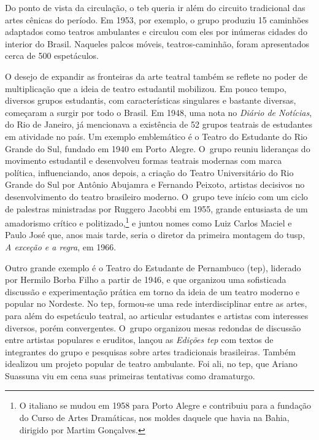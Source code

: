 Do ponto de vista da circulação, o {\sc teb} queria ir além do circuito
tradicional das artes cênicas do período. Em 1953, por exemplo, o grupo
produziu 15 caminhões adaptados como teatros ambulantes e circulou com
eles por inúmeras cidades do interior do Brasil. Naqueles palcos móveis,
teatros-caminhão, foram apresentados cerca de 500 espetáculos.

\subject{Constituição de uma cena estudantil no teatro brasileiro dos anos
1940 e 1950}

O desejo de expandir as fronteiras da arte teatral também se reflete no
poder de multiplicação que a ideia de teatro estudantil mobilizou. Em
pouco tempo, diversos grupos estudantis, com características singulares
e bastante diversas, começaram a surgir por todo o Brasil. Em 1948, uma
nota no {\it Diário de Notícias}, do Rio de Janeiro, já mencionava a
existência de 52 grupos teatrais de estudantes em atividade no país. Um
exemplo emblemático é o Teatro do Estudante do Rio Grande do Sul,
fundado em 1940 em Porto Alegre. O~grupo reuniu lideranças do movimento
estudantil e desenvolveu formas teatrais modernas com marca política,
influenciando, anos depois, a criação do Teatro Universitário do Rio
Grande do Sul por Antônio Abujamra e Fernando Peixoto, artistas
decisivos no desenvolvimento do teatro brasileiro moderno. O~grupo teve
início com um ciclo de palestras ministradas por Ruggero Jacobbi em
1955, grande entusiasta de um amadorismo crítico e
politizado,\footnote{O italiano se mudou em 1958 para Porto Alegre e
  contribuiu para a fundação do Curso de Artes Dramáticas, nos moldes
  daquele que havia na Bahia, dirigido por Martim Gonçalves.} e juntou
nomes como Luiz Carlos Maciel e Paulo José que, anos mais tarde, seria o
diretor da primeira montagem do {\sc tusp}, {\it A exceção e a regra}, em 1966.

Outro grande exemplo é o Teatro do Estudante de Pernambuco ({\sc tep}),
liderado por Hermilo Borba Filho a partir de 1946, e que organizou uma
sofisticada discussão e experimentação prática em torno da ideia de um
teatro moderno e popular no Nordeste. No {\sc tep}, formou-se uma rede
interdisciplinar entre as artes, para além do espetáculo teatral, ao
articular estudantes e artistas com interesses diversos, porém
convergentes. O~grupo organizou mesas redondas de discussão entre
artistas populares e eruditos, lançou as {\it Edições {\sc tep}} com textos de
integrantes do grupo e pesquisas sobre artes tradicionais brasileiras.
Também idealizou um projeto popular de teatro ambulante. Foi ali, no {\sc tep},
que Ariano Suassuna viu em cena suas primeiras tentativas como
dramaturgo.

